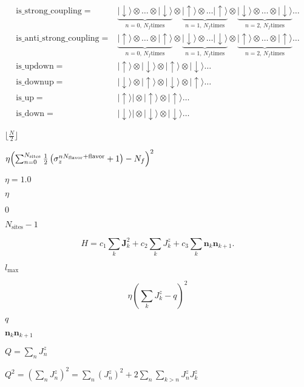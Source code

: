 \documentclass{article}
\begin{document}
{\begin{eqnarray*}
\mathrm{is\_strong\_coupling} =& \underbrace{|\downarrow\rangle \otimes \dots \otimes|\downarrow\rangle}_{n=0,\,N_f \mathrm{ times}} \otimes \underbrace{|\uparrow\rangle \otimes \dots |\uparrow\rangle}_{n=1,\,N_f \mathrm{ times}}\otimes \underbrace{|\downarrow\rangle \otimes \dots \otimes|\downarrow\rangle}_{n=2,\,N_f \mathrm{ times}} \dots \\ 
\mathrm{is\_anti\_strong\_coupling} =& \underbrace{|\uparrow\rangle \otimes \dots \otimes|\uparrow\rangle}_{n=0,\,N_f \mathrm{ times}} \otimes \underbrace{|\downarrow\rangle \otimes \dots |\downarrow\rangle}_{n=1,\,N_f \mathrm{ times}}\otimes \underbrace{|\uparrow\rangle \otimes \dots \otimes|\uparrow\rangle}_{n=2,\,N_f \mathrm{ times}} \dots \\
\mathrm{is\_updown} =& |\uparrow\rangle \otimes |\downarrow\rangle \otimes |\uparrow\rangle \otimes |\downarrow\rangle \dots \\ 
\mathrm{is\_downup} =& |\downarrow\rangle \otimes |\uparrow\rangle \otimes |\downarrow\rangle \otimes |\uparrow\rangle \dots \\ 
\mathrm{is\_up} =& |\uparrow\rangle|\otimes |\uparrow\rangle \otimes |\uparrow\rangle \dots \\
\mathrm{is\_down} =& |\downarrow\rangle|\otimes |\downarrow\rangle \otimes|\downarrow\rangle \dots 
\end{eqnarray*}
\pagebreak

$ \lfloor\frac{N}{2}\rfloor $
\pagebreak

$ \eta \Bigl(\sum_{n=0}^{N_\mathrm{sites}}\frac{1}{2}\left(\sigma_z^{nN_\mathrm{flavor}+\mathrm{flavor}}+1\right) - N_f\Bigr)^2 $
\pagebreak

$ \eta=1.0 $
\pagebreak

$ \eta $
\pagebreak

$ 0 $
\pagebreak

$ N_\mathrm{sites} - 1$
\pagebreak

\[ H = c_1 \sum_k \mathbf{J}^2_k + c_2\sum_k J^z_k + c_3\sum_k \mathbf{n}_k \mathbf{n}_{k+1}. \]
\pagebreak

$ l_\mathrm{max} $
\pagebreak

\[ \eta (\sum_k J^z_k - q)^2 \]
\pagebreak

$ q $
\pagebreak

$ \mathbf{n}_k \mathbf{n}_{k+1} $
\pagebreak

$ Q=\sum_n J^z_n$
\pagebreak

$ Q^2=\left(\sum_n J^z_n\right)^2 = \sum_n (J^z_n)^2 + 2\sum_n \sum_{k>n} J^z_n J^z_k $
\pagebreak

}
\end{document}
